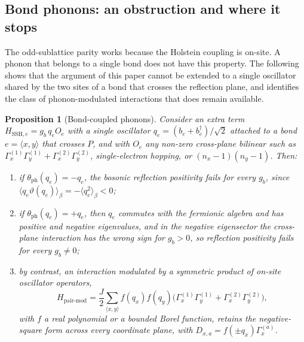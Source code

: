 \documentclass[11pt]{article}
\numberwithin{equation}{section}
\newcommand{\ph}{\mathrm{ph}}
\newcommand{\Gam}{\Gamma}
\newtheorem{proposition}[theorem]{Proposition}
\theoremstyle{definition}
\begin{document}
\subsection{Bond phonons: an obstruction and where it stops}

The odd-sublattice parity works because the Holstein coupling is on-site. A phonon that
belongs to a single bond does not have this property. The following shows that the
argument of this paper cannot be extended to a single oscillator shared by the two sites
of a bond that crosses the reflection plane, and identifies the class of
phonon-modulated interactions that does remain available.

\begin{proposition}[Bond-coupled phonons]\label{prop:bond}
Consider an extra term $H_{\mathrm{SSH},e}=g_{b}\,q_{e}O_{e}$ with a single oscillator
$q_{e}=(b_{e}+b_{e}^{\dagger})/\sqrt2$ attached to a bond $e=\langle x,y\rangle$ that
crosses $P$, and with $O_{e}$ any non-zero cross-plane bilinear such as
$\Gam^{(1)}_{x}\Gam^{(1)}_{y}+\Gam^{(2)}_{x}\Gam^{(2)}_{y}$, single-electron hopping, or
$(n_{x}-1)(n_{y}-1)$. Then:
\begin{enumerate}
\item if $\theta_{\ph}(q_{e})=-q_{e}$, the bosonic reflection positivity fails for every
  $g_{b}$, since $\langle q_{e}\vartheta(q_{e})\rangle_{\beta}=-\langle q_{e}^{2}\rangle_{\beta}<0$;
\item if $\theta_{\ph}(q_{e})=+q_{e}$, then $q_{e}$ commutes with the fermionic algebra
  and has positive and negative eigenvalues, and in the negative eigensector the
  cross-plane interaction has the wrong sign for $g_{b}>0$, so reflection positivity
  fails for every $g_{b}\ne0$;
\item by contrast, an interaction modulated by a symmetric product of on-site
  oscillator operators,
  \begin{equation}
  H_{\text{pair-mod}}=\frac{J}{2}\sum_{\langle x,y\rangle}f(q_{x})f(q_{y})\Big(\Gam^{(1)}_{x}\Gam^{(1)}_{y}+\Gam^{(2)}_{x}\Gam^{(2)}_{y}\Big),
  \label{eq:modmod}
  \end{equation}
  with $f$ a real polynomial or a bounded Borel function, retains the negative-square
  form across every coordinate plane, with $D_{x,a}=f(\pm q_{x})\Gam^{(a)}_{x}$.
\end{enumerate}
\end{proposition}
\end{document}
